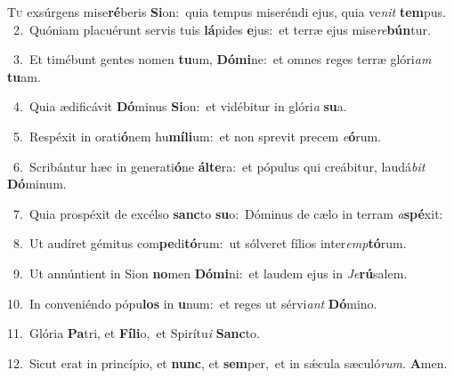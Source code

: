 \lettrine{\initial\textcolor{\initialcolor}{T}}{u} exsúrgens mise\-\textbf{ré}\-beris \textbf{Si}\-on:~\star quia tempus miseréndi ejus, quia ve\textit{nit} \textbf{tem}\-pus.\\
{\numbfont\textcolor{\numbcolor}{~2.}}~Quóniam placuérunt servis tuis \textbf{lá}\-pides \textbf{e}\-jus:~\star et terræ ejus mise\-\textit{re}\-\textbf{bún}tur.\par
{\numbfont\textcolor{\numbcolor}{~3.}}~Et timébunt gentes nomen \textbf{tu}\-um, \textbf{Dó}\-\textbf{mi}ne:~\star et omnes reges terræ glóri\textit{am} \textbf{tu}\-am.\par
{\numbfont\textcolor{\numbcolor}{~4.}}~Quia ædificávit \textbf{Dó}\-minus \textbf{Si}\-on:~\star et vidébitur in glóri\textit{a} \textbf{su}\-a.\par
{\numbfont\textcolor{\numbcolor}{~5.}}~Respéxit in orati\-\textbf{ó}\-nem hu\-\textbf{mí}\-\textbf{li}um:~\star et non sprevit precem \textit{e}\-\textbf{ó}rum.\par
{\numbfont\textcolor{\numbcolor}{~6.}}~Scribántur hæc in generati\-\textbf{ó}\-ne \textbf{ál}\-\textbf{te}ra:~\star et pópulus qui creábitur, laudá\textit{bit} \textbf{Dó}\-minum.\par
{\numbfont\textcolor{\numbcolor}{~7.}}~Quia prospéxit de excélso \textbf{sanc}\-to \textbf{su}\-o:~\star Dóminus de cælo in terram \textit{a}\-\textbf{spé}xit:\par
{\numbfont\textcolor{\numbcolor}{~8.}}~Ut audíret gémitus com\-\textbf{pe}\-di\-\textbf{tó}\-rum:~\star ut sólveret fílios inter\-\textit{emp}\-\textbf{tó}rum.\par
{\numbfont\textcolor{\numbcolor}{~9.}}~Ut annúntient in Sion \textbf{no}\-men \textbf{Dó}\-\textbf{mi}ni:~\star et laudem ejus in \textit{Je}\-\textbf{rú}salem.\par
{\numbfont\textcolor{\numbcolor}{10.}}~In conveniéndo pópu\textbf{los} in \textbf{u}\-num:~\star et reges ut sérvi\textit{ant} \textbf{Dó}\-mino.\par
{\numbfont\textcolor{\numbcolor}{11.}}~Glória \textbf{Pa}\-tri, et \textbf{Fí}\-\textbf{li}o,~\star et Spirítu\textit{i} \textbf{Sanc}\-to.\par
{\numbfont\textcolor{\numbcolor}{12.}}~Sicut erat in princípio, et \textbf{nunc}\-, et \textbf{sem}\-per,~\star et in sǽcula sæculó\-\textit{rum}\-. \textbf{A}\-men.\par
